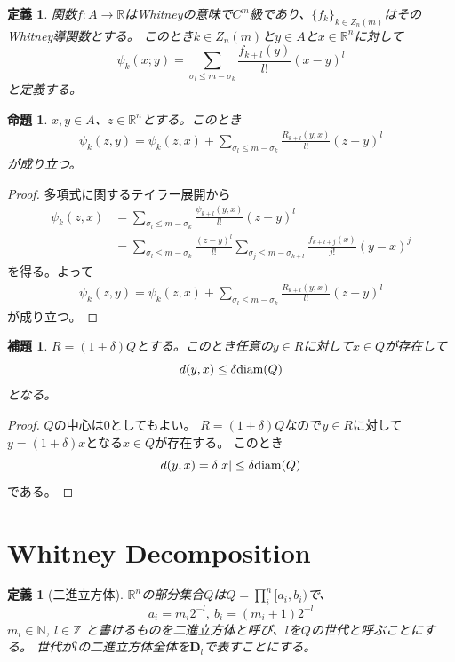\documentclass[leqno]{jsarticle}
\newtheorem{prop}[thm]{命題}
\newtheorem{lem}[thm]{補題}
\newtheorem{df}[thm]{定義}
\newcommand{\nn}{\mathbb{N}}
\newcommand{\zz}{\mathbb{Z}}
\newcommand{\rr}{\mathbb{R}}
\newcommand{\di}{\text{{\rm diam}}}
\begin{document}
\begin{df}
関数$f:A\to \rr$はWhitneyの意味で$C^m$級であり、$\{f_k\}_{k\in Z_n(m)}$はそのWhitney導関数とする。
このとき$k\in Z_n(m)$と$y\in A$と$x\in \rr^n$に対して
\[
\psi_k(x;y)=\sum_{\sigma_l\le m-\sigma_k}\frac{f_{k+l}(y)}{l!}(x-y)^l
\]
と定義する。
\end{df}
\begin{prop}\label{RRR}
$x,y\in A$、$z\in \rr^n$とする。このとき
\begin{align*}
\psi_k(z, y)=\psi_k(z, x)+\sum_{\sigma_l\le m-\sigma_k}\frac{R_{k+l}(y;x)}{l!}(z-y)^l
\end{align*}
が成り立つ。
\end{prop}
\begin{proof}
多項式に関するテイラー展開から
\begin{align*}
\psi_k(z, x)&=\sum_{\sigma_l\le m-\sigma_k}\frac{\psi_{k+l}(y,x)}{l!}(z-y)^l\\
&=\sum_{\sigma_l\le m-\sigma_k}\frac{(z-y)^l}{l!}\sum_{\sigma_j\le m-\sigma_{k+l}}\frac{f_{k+l+j}(x)}{j!}(y-x)^j
\end{align*}
を得る。よって
\begin{align*}
\psi_k(z, y)=\psi_k(z, x)+\sum_{\sigma_l\le m-\sigma_k}\frac{R_{k+l}(y;x)}{l!}(z-y)^l
\end{align*}
が成り立つ。
\end{proof}
\begin{lem}\label{hoho}
$R=(1+\delta)Q$とする。このとき任意の$y\in R$に対して$x\in Q$が存在して
\[
d(y,x)\le \delta\di(Q)
\]
となる。
\end{lem}
\begin{proof}
$Q$の中心は$0$としてもよい。
$R=(1+\delta)Q$なので$y\in R$に対して$y=(1+\delta)x$となる$x\in Q$が存在する。
このとき
\[
d(y,x)=\delta|x|\le \delta\di(Q)
\]
である。
\end{proof}

\section{Whitney Decomposition}
\begin{df}[二進立方体]
$\rr^n$の部分集合$Q$は$Q=\prod_{i}^n[a_i, b_i)$で、
\[
a_i=m_i2^{-l},\ b_i=(m_i+1)2^{-l}
\]
$m_i\in \nn$, $l\in \zz$
と書けるものを二進立方体と呼び、$l$を$Q$の世代と呼ぶことにする。
世代が$l$の二進立方体全体を$\mathbf{D}_l$で表すことにする。
\end{df}
\end{document}
